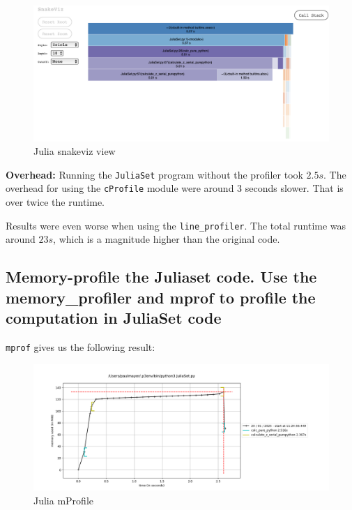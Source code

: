\documentclass[a4paper,12pt]{article}
\begin{document}
\begin{figure}[h!]
  \centering
  \includegraphics[width=\textwidth]{images/julia_snakeviz_view}
  \caption{Julia snakeviz view}
  \label{fig:julia-snakeviz}
\end{figure}

\textbf{Overhead:}
Running the \verb|JuliaSet| program without the profiler took $2.5 s$.
The overhead for using the \verb|cProfile| module were around 3 seconds slower.
That is over twice the runtime.

Results were even worse when using the \verb|line_profiler|.
The total runtime was around $23 s$, which is a magnitude higher than the original code.

\subsection{Memory-profile the Juliaset code. Use the memory\_profiler and mprof to profile the computation in JuliaSet code}

\verb|mprof| gives us the following result:
\begin{figure}[h!]
  \centering
  \includegraphics[width=\textwidth]{images/julia_mprofile}
  \caption{Julia mProfile}
  \label{fig:julia-mprofile}
\end{figure}
\end{document}
